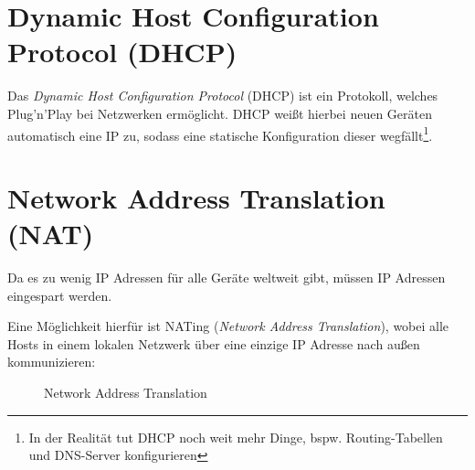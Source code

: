 	\section{Dynamic Host Configuration Protocol (DHCP)} %
		Das \textit{Dynamic Host Configuration Protocol} (DHCP) ist ein Protokoll, welches Plug'n'Play bei Netzwerken ermöglicht. DHCP weißt hierbei neuen Geräten automatisch eine IP zu, sodass eine statische Konfiguration dieser wegfällt\footnote{In der Realität tut DHCP noch weit mehr Dinge, bspw. Routing-Tabellen und DNS-Server konfigurieren}.

	\section{Network Address Translation (NAT)}
		Da es zu wenig IP Adressen für alle Geräte weltweit gibt, müssen IP Adressen eingespart werden.

		Eine Möglichkeit hierfür ist NATing (\textit{Network Address Translation}), wobei alle Hosts in einem lokalen Netzwerk über eine einzige IP Adresse nach außen kommunizieren:
		\begin{figure}[H]
			\centering
			\caption{Network Address Translation}
		\end{figure}


